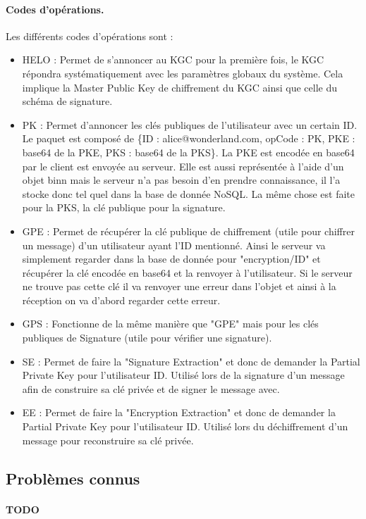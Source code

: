 \paragraph*{Codes d'opérations.}
Les différents codes d'opérations sont :
\begin{itemize}
	\item HELO : Permet de s'annoncer au KGC pour la première fois, le KGC répondra systématiquement avec les paramètres globaux du système. Cela implique la Master Public Key de chiffrement du KGC ainsi que celle du schéma de signature. 
	\item PK : Permet d'annoncer les clés publiques de l'utilisateur avec un certain ID. Le paquet est composé de \{ID : alice@wonderland.com, opCode : PK, PKE : base64 de la PKE, PKS : base64 de la PKS\}. La PKE est encodée en base64 par le client est envoyée au serveur. Elle est aussi représentée à l'aide d'un objet binn mais le serveur n'a pas besoin d'en prendre connaissance, il l'a stocke donc tel quel dans la base de donnée NoSQL. La même chose est faite pour la PKS, la clé publique pour la signature.
	\item GPE : Permet de récupérer la clé publique de chiffrement (utile pour chiffrer un message) d'un utilisateur ayant l'ID mentionné. Ainsi le serveur va simplement regarder dans la base de donnée pour "encryption/ID" et récupérer la clé encodée en base64 et la renvoyer à l'utilisateur. Si le serveur ne trouve pas cette clé il va renvoyer une erreur dans l'objet et ainsi à la réception on va d'abord regarder cette erreur.
	\item GPS : Fonctionne de la même manière que "GPE" mais pour les clés publiques de Signature (utile pour vérifier une signature).
	\item SE : Permet de faire la "Signature Extraction" et donc de demander la Partial Private Key pour l'utilisateur ID. Utilisé lors de la signature d'un message afin de construire sa clé privée et de signer le message avec. 
	\item EE : Permet de faire la "Encryption Extraction" et donc de demander la Partial Private Key pour l'utilisateur ID. Utilisé lors du déchiffrement d'un message pour reconstruire sa clé privée.
\end{itemize}
\subsection{Problèmes connus}
\paragraph*{TODO}

